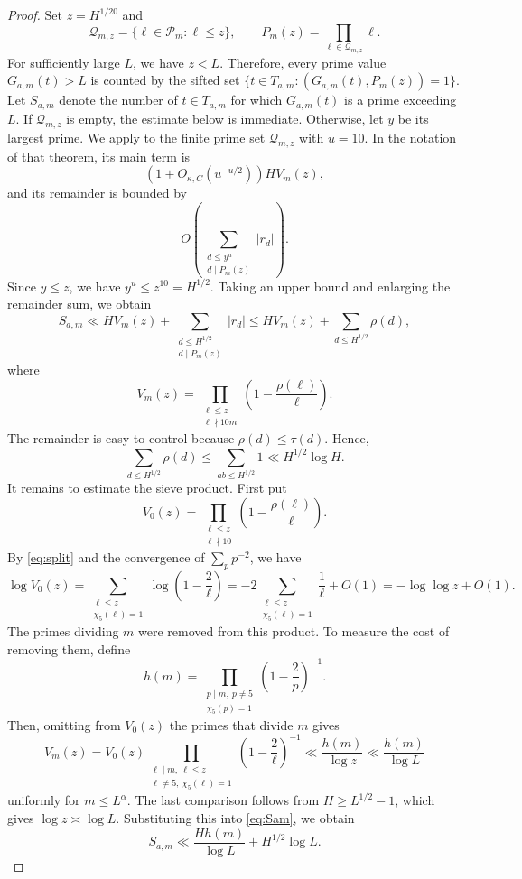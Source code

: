 \documentclass[11pt]{amsart}
\theoremstyle{definition}
\theoremstyle{remark}
\begin{document}
\begin{proof}
Set $z=H^{1/20}$ and
  \[
  \mathcal Q_{m,z}=\{\ell\in\mathcal P_m:\ell\leq z\},
  \qquad
  P_m(z)=\prod_{\ell\in\mathcal Q_{m,z}}\ell.
  \]
For sufficiently large $L$, we have $z<L$.  Therefore, every prime value
$G_{a,m}(t)>L$ is counted by the sifted set
$\{t\in T_{a,m}:(G_{a,m}(t),P_m(z))=1\}$.  Let $S_{a,m}$ denote the number
of $t\in T_{a,m}$ for which $G_{a,m}(t)$ is a prime exceeding $L$.  If
$\mathcal Q_{m,z}$ is empty, the estimate below is immediate.  Otherwise,
let $y$ be its largest prime.  We apply
\cite[Theorem 18.11(a), p.~190]{Koukoulopoulos} to the finite prime set
$\mathcal Q_{m,z}$ with $u=10$.  In the notation of that theorem, its main
term is
\[
\left(1+O_{\kappa,C}(u^{-u/2})\right)H V_m(z),
\]
and its remainder is bounded by
\[
O\left(\sum_{\substack{d\leq y^u\\d\mid P_m(z)}}|r_d|\right).
\]
Since $y\leq z$, we have $y^u\leq z^{10}=H^{1/2}$.  Taking an upper bound
and enlarging the remainder sum, we obtain
\begin{equation}\label{eq:Sam}
S_{a,m}
\ll
  HV_m(z)
  +\sum_{\substack{d\leq H^{1/2}\\ d\mid P_m(z)}}|r_d|
  \leq HV_m(z)+\sum_{d\leq H^{1/2}}\rho(d),
\end{equation}
where
\[
V_m(z)=
\prod_{\substack{\ell\leq z\\ \ell\nmid10m}}
\left(1-\frac{\rho(\ell)}\ell\right).
\]
The remainder is easy to control because $\rho(d)\leq\tau(d)$.  Hence,
\[
\sum_{d\leq H^{1/2}}\rho(d)
\leq\sum_{ab\leq H^{1/2}}1
\ll H^{1/2}\log H.
\]
It remains to estimate the sieve product.  First put
  \[
  V_0(z)=\prod_{\substack{\ell\leq z\\ \ell\nmid10}}
  \left(1-\frac{\rho(\ell)}\ell\right).
  \]
By \eqref{eq:split} and the convergence of $\sum_p p^{-2}$, we have
  \[
  \log V_0(z)
  =\sum_{\substack{\ell\leq z\\ \chi_5(\ell)=1}}
  \log\left(1-\frac2\ell\right)
  =-2\sum_{\substack{\ell\leq z\\ \chi_5(\ell)=1}}\frac1\ell+O(1)
  =-\log\log z+O(1).
  \]
The primes dividing $m$ were removed from this product.  To measure the cost
of removing them, define
\[
h(m)=
\prod_{\substack{p\mid m,\ p\neq5\\ \chi_5(p)=1}}
\left(1-\frac2p\right)^{-1}.
\]
Then, omitting from $V_0(z)$ the primes that divide $m$ gives
  \[
  V_m(z)
  =V_0(z)
  \prod_{\substack{\ell\mid m,\ \ell\leq z\\
                    \ell\neq5,\ \chi_5(\ell)=1}}
  \left(1-\frac2\ell\right)^{-1}
  \ll\frac{h(m)}{\log z}
  \ll\frac{h(m)}{\log L}
  \]
uniformly for $m\leq L^\alpha$.  The last comparison follows from
$H\geq L^{1/2}-1$, which gives $\log z\asymp\log L$.  Substituting this into
\eqref{eq:Sam}, we obtain
\begin{equation}\label{eq:Sam2}
S_{a,m}
\ll
\frac{Hh(m)}{\log L}+H^{1/2}\log L.
\end{equation}


\end{proof}
\end{document}
